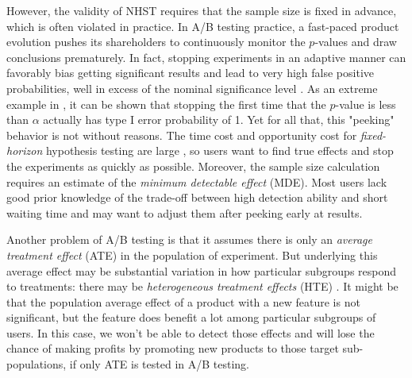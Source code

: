 \documentclass[letterpaper]{article} %
\newcommand{\citep}{\cite}
\begin{document}
However, the validity of NHST requires that the sample size is fixed in advance, which is often violated in practice. In A/B testing practice, a fast-paced product evolution pushes its shareholders to continuously monitor the $p$-values and draw conclusions prematurely. In fact, stopping experiments in an adaptive manner can favorably bias getting significant results and lead to very high false positive probabilities, well in excess of the nominal significance level \citep{goodson2014most,simmons2011false}. As an extreme example in \citep{pekelis2015new}, it can be shown that stopping the first time that the $p$-value is less than $\alpha$ actually has type I error probability of 1. Yet for all that, this "peeking" behavior is not without reasons. The time cost and opportunity cost for \textit{fixed-horizon} hypothesis testing are large \citep{ju2019sequential}, so users want to find true effects and stop the experiments as quickly as possible. Moreover, the sample size calculation requires an estimate of the \textit{minimum detectable effect} (MDE). Most users lack good prior knowledge of the trade-off between high detection ability and short waiting time and may want to adjust them after peeking early at results.

Another problem of A/B testing is that it assumes there is only an \textit{average treatment effect} (ATE) in the population of experiment. But underlying this average effect may be substantial variation in how particular subgroups respond to treatments: there may be \textit{heterogeneous treatment effects} (HTE) \citep{grimmer2017estimating}. It might be that the population average effect of a product with a new feature is not significant, but the feature does benefit a lot among particular subgroups of users. In this case, we won't be able to detect those effects and will lose the chance of making profits by promoting new products to those target sub-populations, if only ATE is tested in A/B testing.
\end{document}
